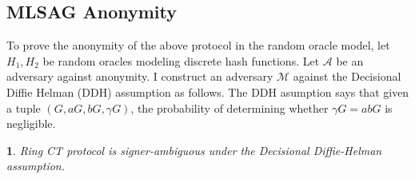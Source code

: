 \documentclass[12pt,oneside,english]{amsart}
\numberwithin{equation}{section}
\numberwithin{figure}{section}
\theoremstyle{plain}
\newtheorem{thm}{\protect\theoremname}
\theoremstyle{plain}
\theoremstyle{remark}
\theoremstyle{plain}
\theoremstyle{remark}
\theoremstyle{remark}
\theoremstyle{plain}
\theoremstyle{definition}
\providecommand{\theoremname}{Theorem}
\begin{document}
\subsection{MLSAG Anonymity}
To prove the anonymity of the above protocol in the random oracle
model, let $H_{1},H_{2}$ be random oracles modeling discrete hash
functions. Let $\mathcal{A}$ be an adversary against anonymity. I
construct an adversary $\mathcal{M}$ against the Decisional Diffie Helman
(DDH) assumption as follows.
The DDH asumption says that given a
tuple $\left(G,aG,bG,\gamma G\right)$, the probability of determining
whether $\gamma G=abG$ is negligible. 
\begin{thm}
\label{thm:Ring-CT-protocol}Ring CT protocol is signer-ambiguous
under the Decisional Diffie-Helman assumption. \end{thm}
\end{document}
